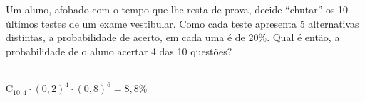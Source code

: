 \begin{ex}
Um aluno, afobado com o tempo que lhe resta de prova, decide “chutar” os 10 últimos testes de um exame vestibular. Como cada teste apresenta 5 alternativas distintas, a probabilidade de acerto, em cada uma é de 20\%. Qual é então, a probabilidade de o aluno acertar 4 das 10 questões?
  \begin{sol}
    \phantom{A} \\
   $ \mathrm{C}_{{10},4}\cdot(0,2)^4\cdot(0,8)^6=8,8\%$
  \end{sol}
\end{ex}